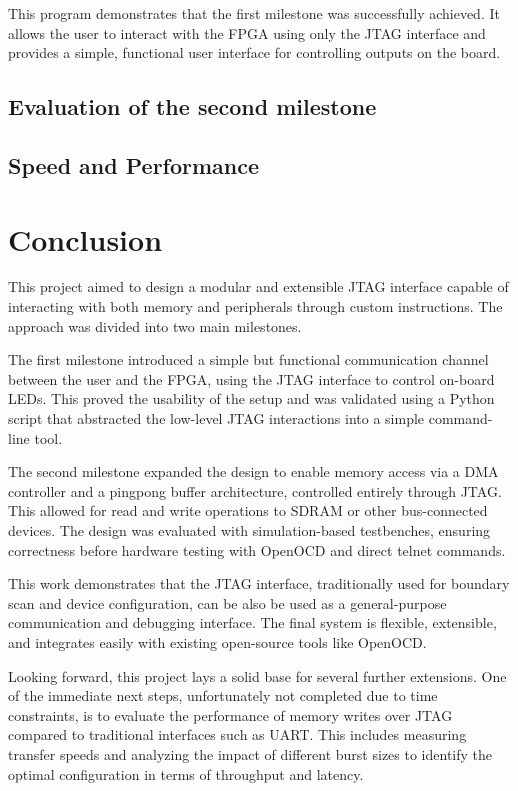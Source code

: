 \documentclass[a4paper,11pt,oneside]{report}
\begin{document}
This program demonstrates that the first milestone was successfully achieved.  
It allows the user to interact with the FPGA using only the JTAG interface and provides a simple, functional user interface for controlling outputs on the board.

\section{Evaluation of the second milestone}


\section{Speed and Performance}



\chapter{Conclusion}

This project aimed to design a modular and extensible JTAG interface capable of interacting with both memory and peripherals through custom instructions. The approach was divided into two main milestones.

The first milestone introduced a simple but functional communication channel between the user and the FPGA, using the JTAG interface to control on-board LEDs. 
This proved the usability of the setup and was validated using a Python script that abstracted the low-level JTAG interactions into a simple command-line tool.

The second milestone expanded the design to enable memory access via a DMA controller and a pingpong buffer architecture, controlled entirely through JTAG. 
This allowed for read and write operations to SDRAM or other bus-connected devices. The design was evaluated with simulation-based testbenches, ensuring correctness before hardware testing with OpenOCD and direct telnet commands.

This work demonstrates that the JTAG interface, traditionally used for boundary scan and device configuration, can be also be used as a general-purpose communication and debugging interface. 
The final system is flexible, extensible, and integrates easily with existing open-source tools like OpenOCD.

Looking forward, this project lays a solid base for several further extensions. 
One of the immediate next steps, unfortunately not completed due to time constraints, is to evaluate the performance of memory writes over JTAG compared to traditional interfaces such as UART. 
This includes measuring transfer speeds and analyzing the impact of different burst sizes to identify the optimal configuration in terms of throughput and latency.
\end{document}
